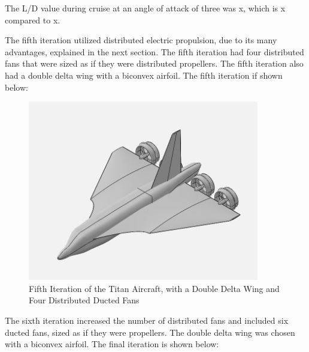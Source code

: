 \documentclass{article}
\begin{document}
The L/D value during cruise at an angle of attack of three was x, which is x compared to x. 

The fifth iteration utilized distributed electric propulsion, due to its many advantages, explained in the next section. The fifth iteration had four distributed fans that were sized as if they were distributed propellers. The fifth iteration also had a double delta wing with a biconvex airfoil. The fifth iteration if shown below: 

\begin{figure}[H]
    \centering
    \includegraphics[width = 0.90\textwidth]{Figures/TitanLanderv7LeftIso.png}
    \caption{Fifth Iteration of the Titan Aircraft, with a Double Delta Wing and Four Distributed Ducted Fans}
    \label{fig:TitanLanderv7}
\end{figure}


The sixth iteration increased the number of distributed fans and included six ducted fans, sized as if they were propellers. The double delta wing was chosen with a biconvex airfoil. The final iteration is shown below: 
\end{document}
